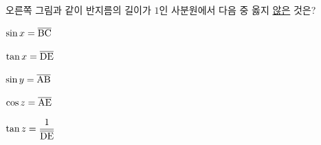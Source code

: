 \noindent\begin{minipage}[t]{0.58\linewidth}\vspace{0pt}\raggedright 오른쪽 그림과 같이 반지름의 길이가 $1$인 사분원에서 다음 중 옳지 \underline{않은} 것은?\end{minipage}\hfill\begin{minipage}[t]{0.4\linewidth}\vspace{0pt}\centering \resizebox{\ifdim\width>\linewidth\linewidth\else\width\fi}{!}{}\end{minipage}\par
\begin{choicesv}{\rule[-3ex]{0pt}{8ex}$\sin x=\overline{\mathrm{BC}}$}{\rule[-3ex]{0pt}{8ex}$\tan x=\overline{\mathrm{DE}}$}{\rule[-3ex]{0pt}{8ex}$\sin y=\overline{\mathrm{AB}}$}{\rule[-3ex]{0pt}{8ex}$\cos z=\overline{\mathrm{AE}}$}{\rule[-3ex]{0pt}{8ex}$\tan z=\dfrac{1}{\overline{\mathrm{DE}}}$}\end{choicesv}
